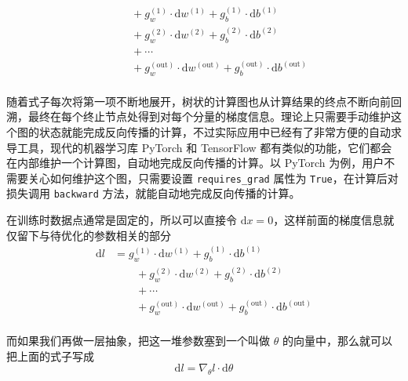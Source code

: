 \[\begin{aligned}
                    & \qquad + g_w^{(1)} \cdot \mathrm{d}w^{(1)} + g_b^{(1)} \cdot \mathrm{d}b^{(1)}                                                                                    \\
                    & \qquad + g_w^{(2)} \cdot \mathrm{d}w^{(2)} + g_b^{(2)} \cdot \mathrm{d}b^{(2)}                                                                                    \\
                    & \qquad + \cdots                                                                                                                                                   \\
                    & \qquad + g_w^{(\text{out})} \cdot \mathrm{d}w^{(\text{out})} + g_b^{(\text{out})} \cdot \mathrm{d}b^{(\text{out})}                                                \\
    \end{aligned}
\]

随着式子每次将第一项不断地展开，树状的计算图也从计算结果的终点不断向前回溯，最终在每个终止节点处得到对每个分量的梯度信息。理论上只需要手动维护这个图的状态就能完成反向传播的计算，不过实际应用中已经有了非常方便的自动求导工具，现代的机器学习库 PyTorch 和 TensorFlow 都有类似的功能，它们都会在内部维护一个计算图，自动地完成反向传播的计算。以 PyTorch 为例，用户不需要关心如何维护这个图，只需要设置 \texttt{requires\_grad} 属性为 \texttt{True}，在计算后对损失调用 \texttt{backward} 方法，就能自动地完成反向传播的计算。

在训练时数据点通常是固定的，所以可以直接令 $\mathrm{d}x = 0$，这样前面的梯度信息就仅留下与待优化的参数相关的部分
\[
    \begin{aligned}
        \mathrm{d}l & = g_w^{(1)} \cdot \mathrm{d}w^{(1)} + g_b^{(1)} \cdot \mathrm{d}b^{(1)}                                            \\
                    & \qquad + g_w^{(2)} \cdot \mathrm{d}w^{(2)} + g_b^{(2)} \cdot \mathrm{d}b^{(2)}                                     \\
                    & \qquad + \cdots                                                                                                    \\
                    & \qquad + g_w^{(\text{out})} \cdot \mathrm{d}w^{(\text{out})} + g_b^{(\text{out})} \cdot \mathrm{d}b^{(\text{out})} \\
    \end{aligned}
\]

而如果我们再做一层抽象，把这一堆参数塞到一个叫做 $\theta$ 的向量中，那么就可以把上面的式子写成
\[
    \mathrm{d}l = \nabla_\theta l \cdot \mathrm{d}\theta
\]

